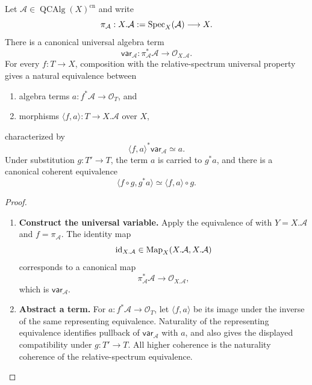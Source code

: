 \begin{proposition}
\label{prop:relative-spectrum-universal-variable}
Let \(\mathcal A\in\operatorname{QCAlg}(X)^{\mathrm{cn}}\) and write
\[
    \pi_{\mathcal A}:
    X.\mathcal A:=\operatorname{Spec}_X(\mathcal A)
    \longrightarrow
    X.
\]
There is a canonical universal algebra term
\[
    \mathsf{var}_{\mathcal A}:
    \pi_{\mathcal A}^*\mathcal A
    \longrightarrow
    \mathcal O_{X.\mathcal A}.
\]
For every \(f:T\to X\), composition with the relative-spectrum universal
property gives a natural equivalence between
\begin{enumerate}[label=(\roman*)]
    \item algebra terms \(a:f^*\mathcal A\to\mathcal O_T\), and
    \item morphisms \(\langle f,a\rangle:T\to X.\mathcal A\) over \(X\),
\end{enumerate}
characterized by
\[
    \langle f,a\rangle^*\mathsf{var}_{\mathcal A}
    \simeq
    a.
\]
Under substitution \(g:T'\to T\), the term \(a\) is carried to \(g^*a\),
and there is a canonical coherent equivalence
\[
    \langle f\circ g,g^*a\rangle
    \simeq
    \langle f,a\rangle\circ g.
\]
\end{proposition}

\begin{proof}
\leavevmode
\begin{enumerate}[label=\textup{(\arabic*)}]
    \item \textbf{Construct the universal variable.}
    Apply the equivalence of
     with
    \(Y=X.\mathcal A\) and \(f=\pi_{\mathcal A}\). The identity map
    \[
        \operatorname{id}_{X.\mathcal A}
        \in
        \operatorname{Map}_X(X.\mathcal A,X.\mathcal A)
    \]
    corresponds to a canonical map
    \[
        \pi_{\mathcal A}^*\mathcal A
        \longrightarrow
        \mathcal O_{X.\mathcal A},
    \]
    which is \(\mathsf{var}_{\mathcal A}\).

    \item \textbf{Abstract a term.}
    For \(a:f^*\mathcal A\to\mathcal O_T\), let
    \(\langle f,a\rangle\) be its image under the inverse of the same
    representing equivalence. Naturality of the representing equivalence
    identifies pullback of \(\mathsf{var}_{\mathcal A}\) with \(a\), and
    also gives the displayed compatibility under \(g:T'\to T\). All higher
    coherence is the naturality coherence of the relative-spectrum
    equivalence.
\end{enumerate}
\end{proof}

